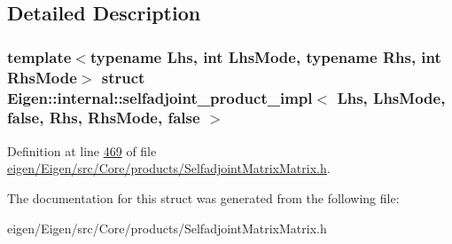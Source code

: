 \subsection{Detailed Description}
\subsubsection*{template$<$typename Lhs, int Lhs\+Mode, typename Rhs, int Rhs\+Mode$>$\newline
struct Eigen\+::internal\+::selfadjoint\+\_\+product\+\_\+impl$<$ Lhs, Lhs\+Mode, false, Rhs, Rhs\+Mode, false $>$}



Definition at line \hyperlink{eigen_2_eigen_2src_2_core_2products_2_selfadjoint_matrix_matrix_8h_source_l00469}{469} of file \hyperlink{eigen_2_eigen_2src_2_core_2products_2_selfadjoint_matrix_matrix_8h_source}{eigen/\+Eigen/src/\+Core/products/\+Selfadjoint\+Matrix\+Matrix.\+h}.



The documentation for this struct was generated from the following file\+:\begin{DoxyCompactItemize}
\item 
eigen/\+Eigen/src/\+Core/products/\+Selfadjoint\+Matrix\+Matrix.\+h\end{DoxyCompactItemize}
